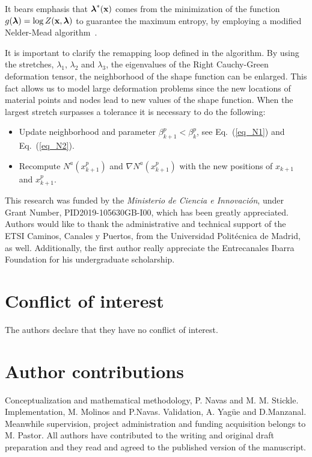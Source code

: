 \documentclass[twocolumn]{svjour3}          %
\begin{document}
It bears emphasis that $\boldsymbol{\lambda}^*(\bf x)$ comes from the minimization of the function $g(\boldsymbol{\lambda})=\log Z(\bf x, \boldsymbol{\lambda})$ to guarantee the maximum entropy, by employing a modified Nelder-Mead algorithm~\cite{Navas:17}.

It is important to clarify the remapping loop defined in the algorithm. By using the stretches, $\lambda_1$, $\lambda_2$ and $\lambda_3$, the eigenvalues of the Right Cauchy-Green deformation tensor,   the neighborhood of the shape function can be enlarged. This fact allows us to model large deformation problems since the new locations of material points and nodes  lead to new values of the shape function. When the largest stretch surpasses a tolerance it is necessary to do the following:
\begin{itemize}
\item Update neighborhood and parameter $\beta_{k+1}^p < \beta_{k}^p$, see Eq.~(\ref{eq_N1}) and Eq.~(\ref{eq_N2}).
\item Recompute $N^a(x_{k+1}^p)$ and $\nabla N^a(x_{k+1}^p)$ with the new positions of $x_{k+1}$ and $x_{k+1}^p$.
\end{itemize}


\begin{acknowledgements}
This research was funded by the \textit{Ministerio de Ciencia e Innovaci\'on}, under Grant Number, PID2019-105630GB-I00, which has been greatly appreciated. Authors would like to thank the administrative and technical support of the ETSI Caminos, Canales y Puertos, from the Universidad Polit\'ecnica de Madrid, as well. Additionally, the first author really appreciate the Entrecanales Ibarra Foundation for his undergraduate scholarship.
\end{acknowledgements}


%
\section*{Conflict of interest}
The authors declare that they have no conflict of interest.

\section*{Author contributions}
Conceptualization and mathematical methodology, P. Navas and M. M. Stickle. Implementation, M. Molinos and P.Navas. Validation, A. Yag\"ue and D.Manzanal. Meanwhile supervision, project administration and funding acquisition belongs to M. Pastor. All authors have contributed to the writing and original draft preparation and they read and agreed to the published version of the manuscript.
\end{document}
